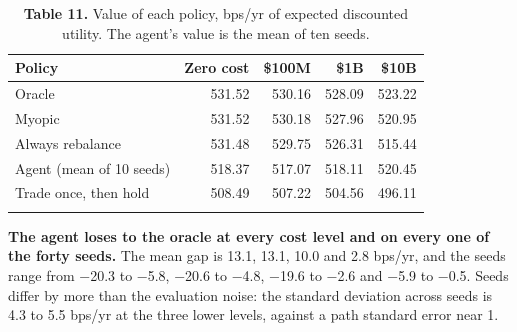 \documentclass[
  11pt]{article}
\begin{document}
\begin{table}[htbp]
\centering\small
\caption{\textbf{Table 11.} Value of each policy, bps/yr of expected
discounted utility. The agent's value is the mean of ten
seeds.}
\begin{tabular}{@{}lrrrr@{}}
\toprule\noalign{}
Policy & Zero cost & \$100M & \$1B & \$10B \\
\midrule\noalign{}
Oracle & 531.52 & 530.16 & 528.09 & 523.22 \\
Myopic & 531.52 & 530.18 & 527.96 & 520.95 \\
Always rebalance & 531.48 & 529.75 & 526.31 & 515.44 \\
Agent (mean of 10 seeds) & 518.37 & 517.07 & 518.11 & 520.45 \\
Trade once, then hold & 508.49 & 507.22 & 504.56 & 496.11 \\
\bottomrule\noalign{}
\end{tabular}
\end{table}

\textbf{The agent loses to the oracle at every cost level and on every
one of the forty seeds.} The mean gap is 13.1, 13.1, 10.0 and 2.8
bps/yr, and the seeds range from −20.3 to −5.8, −20.6 to −4.8, −19.6 to
−2.6 and −5.9 to −0.5. Seeds differ by more than the evaluation noise:
the standard deviation across seeds is 4.3 to 5.5 bps/yr at the three
lower levels, against a path standard error near 1.
\end{document}
